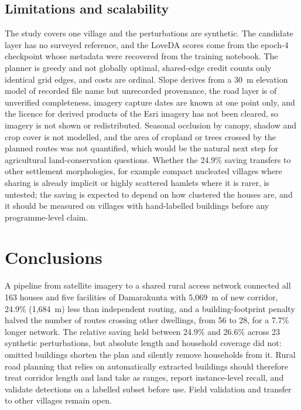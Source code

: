 \subsection{Limitations and scalability}
The study covers one village and the perturbations are synthetic. The candidate layer has no surveyed reference, and the LoveDA scores come from the epoch-4 checkpoint whose metadata were recovered from the training notebook. The planner is greedy and not globally optimal, shared-edge credit counts only identical grid edges, and costs are ordinal. Slope derives from a 30~m elevation model of recorded file name but unrecorded provenance, the road layer is of unverified completeness, imagery capture dates are known at one point only, and the licence for derived products of the Esri imagery has not been cleared, so imagery is not shown or redistributed. Seasonal occlusion by canopy, shadow and crop cover is not modelled, and the area of cropland or trees crossed by the planned routes was not quantified, which would be the natural next step for agricultural land-conservation questions. Whether the 24.9\% saving transfers to other settlement morphologies, for example compact nucleated villages where sharing is already implicit or highly scattered hamlets where it is rarer, is untested; the saving is expected to depend on how clustered the houses are, and it should be measured on villages with hand-labelled buildings before any programme-level claim.

\section{Conclusions}
A pipeline from satellite imagery to a shared rural access network connected all 163 houses and five facilities of Damarakunta with 5{,}069~m of new corridor, 24.9\% (1{,}684~m) less than independent routing, and a building-footprint penalty halved the number of routes crossing other dwellings, from 56 to 28, for a 7.7\% longer network. The relative saving held between 24.9\% and 26.6\% across 23 synthetic perturbations, but absolute length and household coverage did not: omitted buildings shorten the plan and silently remove households from it. Rural road planning that relies on automatically extracted buildings should therefore treat corridor length and land take as ranges, report instance-level recall, and validate detections on a labelled subset before use. Field validation and transfer to other villages remain open.
